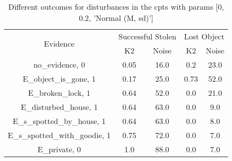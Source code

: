 \begin{table}\begin{tabular}{c|cc|cc}\toprule\multirow{2}{*}{Evidence} & \multicolumn{2}{c}{Successful Stolen} & \multicolumn{2}{c}{Lost Object} \\& {K2} & {Noise} & {K2} & {Noise} \\\midrule
no\_evidence, 0 & \cellcolor{Bittersweet}0.05&\cellcolor{Bittersweet}16.0&0.2&23.0\\E\_object\_is\_gone, 1 & \cellcolor{Bittersweet}0.17&\cellcolor{Bittersweet}25.0&\cellcolor{Bittersweet}0.73&\cellcolor{Bittersweet}52.0\\E\_broken\_lock, 1 & \cellcolor{Bittersweet}0.64&\cellcolor{Bittersweet}52.0&\cellcolor{Bittersweet}0.0&\cellcolor{Bittersweet}21.0\\E\_disturbed\_house, 1 & 0.64&63.0&\cellcolor{Bittersweet}0.0&\cellcolor{Bittersweet}9.0\\E\_s\_spotted\_by\_house, 1 & 0.64&63.0&\cellcolor{Bittersweet}0.0&\cellcolor{Bittersweet}8.0\\E\_s\_spotted\_with\_goodie, 1 & 0.75&72.0&\cellcolor{Bittersweet}0.0&\cellcolor{Bittersweet}7.0\\E\_private, 0 & \cellcolor{Bittersweet}1.0&\cellcolor{Bittersweet}88.0&\cellcolor{Bittersweet}0.0&\cellcolor{Bittersweet}7.0\\\bottomrule\end{tabular}\caption{Different outcomes for disturbances in the cpts with params [0, 0.2, 'Normal (M, sd)']}\end{table}